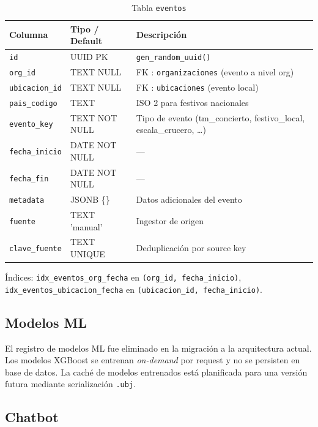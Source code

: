 \documentclass[12pt, a4paper]{article}
\begin{document}
\begin{table}[H]
\centering
\renewcommand{\arraystretch}{1.2}
\begin{tabular}{llp{5.5cm}}
\toprule
\textbf{Columna} & \textbf{Tipo / Default} & \textbf{Descripción} \\
\midrule
\texttt{id}           & UUID PK       & \texttt{gen\_random\_uuid()} \\
\texttt{org\_id}      & TEXT NULL     & FK : \texttt{organizaciones} (evento a nivel org) \\
\texttt{ubicacion\_id} & TEXT NULL    & FK : \texttt{ubicaciones} (evento local) \\
\texttt{pais\_codigo} & TEXT          & ISO 2 para festivos nacionales \\
\texttt{evento\_key}  & TEXT NOT NULL & Tipo de evento (tm\_concierto, festivo\_local, escala\_crucero, \ldots) \\
\texttt{fecha\_inicio} & DATE NOT NULL & — \\
\texttt{fecha\_fin}   & DATE NOT NULL & — \\
\texttt{metadata}     & JSONB \{\}   & Datos adicionales del evento \\
\texttt{fuente}       & TEXT 'manual' & Ingestor de origen \\
\texttt{clave\_fuente} & TEXT UNIQUE  & Deduplicación por source key \\
\bottomrule
\end{tabular}
\caption{Tabla \texttt{eventos}}
\end{table}

Índices: \texttt{idx\_eventos\_org\_fecha} en \texttt{(org\_id, fecha\_inicio)}, \texttt{idx\_eventos\_ubicacion\_fecha} en \texttt{(ubicacion\_id, fecha\_inicio)}.

\subsection{Modelos ML}

El registro de modelos ML fue eliminado en la migración a la arquitectura actual.
Los modelos XGBoost se entrenan \textit{on-demand} por request y no se persisten en base de datos.
La caché de modelos entrenados está planificada para una versión futura mediante serialización \texttt{.ubj}.

\subsection{Chatbot}
\end{document}
